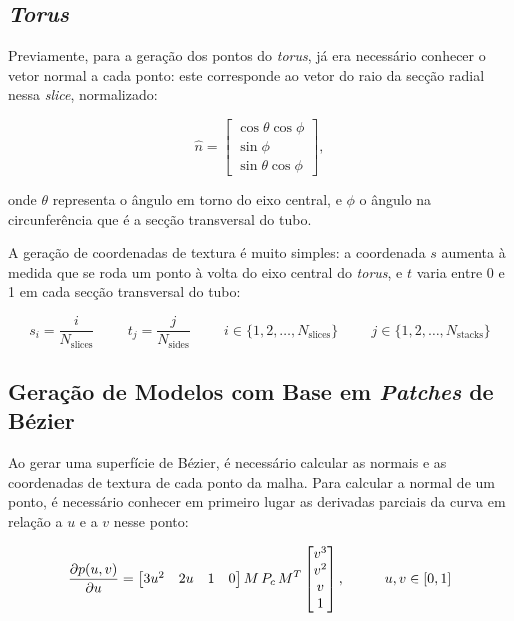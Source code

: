 \documentclass[12pt, a4paper]{article}
\begin{document}
\subsection{\emph{Torus}}

Previamente, para a geração dos pontos do \emph{torus}, já era necessário conhecer o vetor normal a
cada ponto: este corresponde ao vetor do raio da secção radial nessa \emph{slice}, normalizado:

$$
\hat{n} = \begin{bmatrix}
    \cos \theta \cos \phi \\
    \sin \phi \\
    \sin \theta \cos \phi
\end{bmatrix},
$$

onde $\theta$ representa o ângulo em torno do eixo central, e $\phi$ o ângulo na circunferência que
é a secção transversal do tubo.

A geração de coordenadas de textura é muito simples: a coordenada $s$ aumenta à medida que se roda
um ponto à volta do eixo central do \emph{torus}, e $t$ varia entre 0 e 1 em cada secção
transversal do tubo:

$$
s_i = \frac{i}{N_\text{slices}}
\hspace{1cm}
t_j = \frac{j}{N_\text{sides}}
\hspace{1cm}
i \in \lbrace 1, 2, \ldots, N_\text{slices} \rbrace
\hspace{1cm}
j \in \lbrace 1, 2, \ldots, N_\text{stacks} \rbrace
$$

\subsection{Geração de Modelos com Base em \emph{Patches} de Bézier}

Ao gerar uma superfície de Bézier, é necessário calcular as normais e as coordenadas de textura de
cada ponto da malha. Para calcular a normal de um ponto, é necessário conhecer em primeiro lugar as
derivadas parciais da curva em relação a $u$ e a $v$ nesse ponto:

$$
\def\arraystretch{1}
\frac{\partial p(u, v)}{\partial u} =
\begin{bmatrix}
    3 u^2 & 2 u & 1 & 0
\end{bmatrix}
M \, P_c \, M^T
\begin{bmatrix}
    v^3 \\ v^2 \\ v \\ 1
\end{bmatrix},
\hspace{1cm}
u, v \in \left [ 0, 1 \right ]
$$
\end{document}
